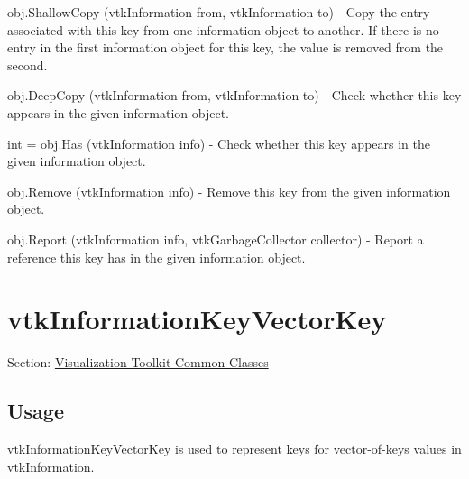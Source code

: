 \begin{DoxyItemize}
\item {\ttfamily obj.\-Shallow\-Copy (vtk\-Information from, vtk\-Information to)} -\/ Copy the entry associated with this key from one information object to another. If there is no entry in the first information object for this key, the value is removed from the second.  
\item {\ttfamily obj.\-Deep\-Copy (vtk\-Information from, vtk\-Information to)} -\/ Check whether this key appears in the given information object.  
\item {\ttfamily int = obj.\-Has (vtk\-Information info)} -\/ Check whether this key appears in the given information object.  
\item {\ttfamily obj.\-Remove (vtk\-Information info)} -\/ Remove this key from the given information object.  
\item {\ttfamily obj.\-Report (vtk\-Information info, vtk\-Garbage\-Collector collector)} -\/ Report a reference this key has in the given information object.  
\end{DoxyItemize}\hypertarget{vtkcommon_vtkinformationkeyvectorkey}{}\section{vtk\-Information\-Key\-Vector\-Key}\label{vtkcommon_vtkinformationkeyvectorkey}
Section\-: \hyperlink{sec_vtkcommon}{Visualization Toolkit Common Classes} \hypertarget{vtkwidgets_vtkxyplotwidget_Usage}{}\subsection{Usage}\label{vtkwidgets_vtkxyplotwidget_Usage}
vtk\-Information\-Key\-Vector\-Key is used to represent keys for vector-\/of-\/keys values in vtk\-Information.

